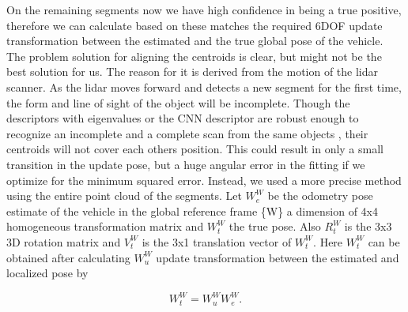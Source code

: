 \documentclass[letterpaper, 10 pt, conference]{ieeeconf}  %
\begin{document}
On the remaining segments now we have high confidence in being a true positive, therefore we can calculate based on these matches the required 6DOF update transformation between the estimated and the true global pose of the vehicle. The problem solution for aligning the centroids is clear, but might not be the best solution for us. The reason for it is derived from the motion of the lidar scanner. As the lidar moves forward and detects a new segment for the first time, the form and line of sight of the object will be incomplete. Though the descriptors with eigenvalues or the CNN descriptor are robust enough to recognize an incomplete and a complete scan from the same objects \cite{segmap}, their centroids will not cover each others position. This could result in only a small transition in the update pose, but a huge angular error in the fitting if we optimize for the minimum squared error. Instead, we used a more precise method using the entire point cloud of the segments. Let $W_e^W$ be the odometry pose estimate of the vehicle in the global reference frame \{W\} a dimension of 4x4 homogeneous transformation matrix and $W_t^W$ the true pose. Also $R_t^W$ is the 3x3 3D rotation matrix and $V_t^W$ is the 3x1 translation vector of $W_t^W$. Here $W_t^W$ can be obtained after calculating $W_u^W$ update transformation between the estimated and localized pose by

\begin{equation}
    W_t^W=W_u^W  W_e^W.
\end{equation}
\end{document}

